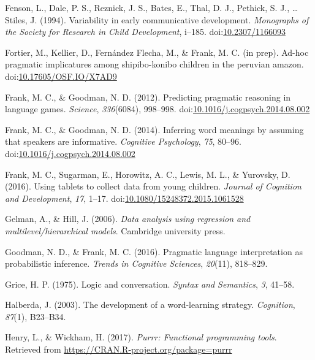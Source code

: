 \documentclass[man]{apa6}
\theoremstyle{definition}
\theoremstyle{definition}
\theoremstyle{definition}
\theoremstyle{remark}
\begin{document}
\hypertarget{ref-fenson1994}{}
Fenson, L., Dale, P. S., Reznick, J. S., Bates, E., Thal, D. J.,
Pethick, S. J., \ldots{} Stiles, J. (1994). Variability in early
communicative development. \emph{Monographs of the Society for Research
in Child Development}, i--185.
doi:\href{https://doi.org/10.2307/1166093}{10.2307/1166093}

\hypertarget{ref-fortierunderrev}{}
Fortier, M., Kellier, D., Fernández Flecha, M., \& Frank, M. C. (in
prep). Ad-hoc pragmatic implicatures among shipibo-konibo children in
the peruvian amazon.
doi:\href{https://doi.org/10.17605/OSF.IO/X7AD9}{10.17605/OSF.IO/X7AD9}

\hypertarget{ref-frank2012}{}
Frank, M. C., \& Goodman, N. D. (2012). Predicting pragmatic reasoning
in language games. \emph{Science}, \emph{336}(6084), 998--998.
doi:\href{https://doi.org/10.1016/j.cogpsych.2014.08.002}{10.1016/j.cogpsych.2014.08.002}

\hypertarget{ref-frank2014}{}
Frank, M. C., \& Goodman, N. D. (2014). Inferring word meanings by
assuming that speakers are informative. \emph{Cognitive Psychology},
\emph{75}, 80--96.
doi:\href{https://doi.org/10.1016/j.cogpsych.2014.08.002}{10.1016/j.cogpsych.2014.08.002}

\hypertarget{ref-frank2016}{}
Frank, M. C., Sugarman, E., Horowitz, A. C., Lewis, M. L., \& Yurovsky,
D. (2016). Using tablets to collect data from young children.
\emph{Journal of Cognition and Development}, \emph{17}, 1--17.
doi:\href{https://doi.org/10.1080/15248372.2015.1061528}{10.1080/15248372.2015.1061528}

\hypertarget{ref-gelman2006data}{}
Gelman, A., \& Hill, J. (2006). \emph{Data analysis using regression and
multilevel/hierarchical models}. Cambridge university press.

\hypertarget{ref-goodman2016}{}
Goodman, N. D., \& Frank, M. C. (2016). Pragmatic language
interpretation as probabilistic inference. \emph{Trends in Cognitive
Sciences}, \emph{20}(11), 818--829.

\hypertarget{ref-grice1975logic}{}
Grice, H. P. (1975). Logic and conversation. \emph{Syntax and
Semantics}, \emph{3}, 41--58.

\hypertarget{ref-halberda2003development}{}
Halberda, J. (2003). The development of a word-learning strategy.
\emph{Cognition}, \emph{87}(1), B23--B34.

\hypertarget{ref-R-purrr}{}
Henry, L., \& Wickham, H. (2017). \emph{Purrr: Functional programming
tools}. Retrieved from \url{https://CRAN.R-project.org/package=purrr}
\end{document}
